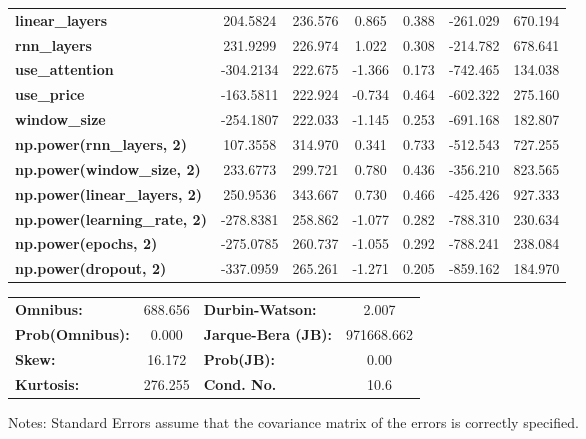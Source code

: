 \begin{center}
\begin{tabular}{lcccccc}
\textbf{linear\_layers}              &     204.5824  &      236.576     &     0.865  &         0.388        &     -261.029    &      670.194     \\
\textbf{rnn\_layers}                 &     231.9299  &      226.974     &     1.022  &         0.308        &     -214.782    &      678.641     \\
\textbf{use\_attention}              &    -304.2134  &      222.675     &    -1.366  &         0.173        &     -742.465    &      134.038     \\
\textbf{use\_price}                  &    -163.5811  &      222.924     &    -0.734  &         0.464        &     -602.322    &      275.160     \\
\textbf{window\_size}                &    -254.1807  &      222.033     &    -1.145  &         0.253        &     -691.168    &      182.807     \\
\textbf{np.power(rnn\_layers, 2)}    &     107.3558  &      314.970     &     0.341  &         0.733        &     -512.543    &      727.255     \\
\textbf{np.power(window\_size, 2)}   &     233.6773  &      299.721     &     0.780  &         0.436        &     -356.210    &      823.565     \\
\textbf{np.power(linear\_layers, 2)} &     250.9536  &      343.667     &     0.730  &         0.466        &     -425.426    &      927.333     \\
\textbf{np.power(learning\_rate, 2)} &    -278.8381  &      258.862     &    -1.077  &         0.282        &     -788.310    &      230.634     \\
\textbf{np.power(epochs, 2)}         &    -275.0785  &      260.737     &    -1.055  &         0.292        &     -788.241    &      238.084     \\
\textbf{np.power(dropout, 2)}        &    -337.0959  &      265.261     &    -1.271  &         0.205        &     -859.162    &      184.970     \\
\bottomrule
\end{tabular}
\begin{tabular}{lclc}
\textbf{Omnibus:}       & 688.656 & \textbf{  Durbin-Watson:     } &     2.007   \\
\textbf{Prob(Omnibus):} &   0.000 & \textbf{  Jarque-Bera (JB):  } & 971668.662  \\
\textbf{Skew:}          &  16.172 & \textbf{  Prob(JB):          } &      0.00   \\
\textbf{Kurtosis:}      & 276.255 & \textbf{  Cond. No.          } &      10.6   \\
\bottomrule
\end{tabular}
\end{center}

Notes: \newline
 [1] Standard Errors assume that the covariance matrix of the errors is correctly specified.